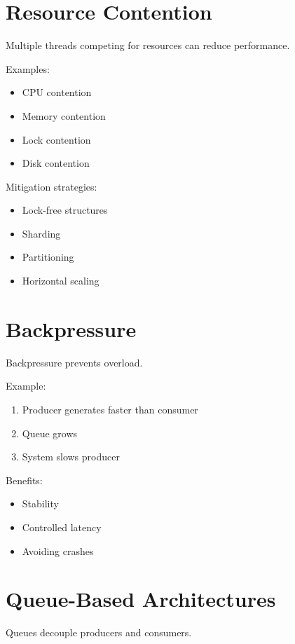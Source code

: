 \section{Resource Contention}

Multiple threads competing for resources can reduce performance.

Examples:

\begin{itemize}
\item CPU contention
\item Memory contention
\item Lock contention
\item Disk contention
\end{itemize}

Mitigation strategies:

\begin{itemize}
\item Lock-free structures
\item Sharding
\item Partitioning
\item Horizontal scaling
\end{itemize}

\section{Backpressure}

Backpressure prevents overload.

Example:

\begin{enumerate}
\item Producer generates faster than consumer
\item Queue grows
\item System slows producer
\end{enumerate}

Benefits:

\begin{itemize}
\item Stability
\item Controlled latency
\item Avoiding crashes
\end{itemize}

\section{Queue-Based Architectures}

Queues decouple producers and consumers.

